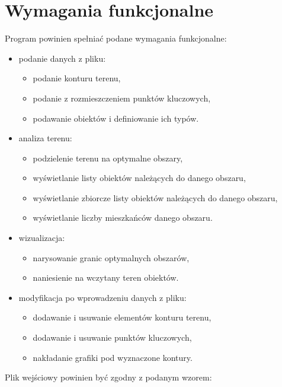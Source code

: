 \documentclass[a4paper,11pt]{article}
\begin{document}
\section{Wymagania funkcjonalne}
\noindent
Program powinien spełniać podane wymagania funkcjonalne:
\begin{itemize}
\item podanie danych z pliku:
\begin{itemize}
\item podanie konturu terenu,
\item podanie z rozmieszczeniem punktów kluczowych,
\item podawanie obiektów i definiowanie ich typów.
\end{itemize}
\item analiza terenu:
\begin{itemize}
\item podzielenie terenu na optymalne obszary,
\item wyświetlanie listy obiektów należących do danego obszaru,
\item wyświetlanie zbiorcze listy obiektów należących do danego obszaru,
\item wyświetlanie liczby mieszkańców danego obszaru.
\end{itemize}
\item wizualizacja:
\begin{itemize}
\item narysowanie granic optymalnych obszarów,
\item naniesienie na wczytany teren obiektów.
\end{itemize}
\item modyfikacja po wprowadzeniu danych z pliku:
\begin{itemize}
\item dodawanie i usuwanie elementów konturu terenu,
\item dodawanie i usuwanie punktów kluczowych,
\item nakładanie grafiki pod wyznaczone kontury.
\end{itemize}
\end{itemize}

Plik wejściowy powinien być zgodny z podanym wzorem:
\end{document}
